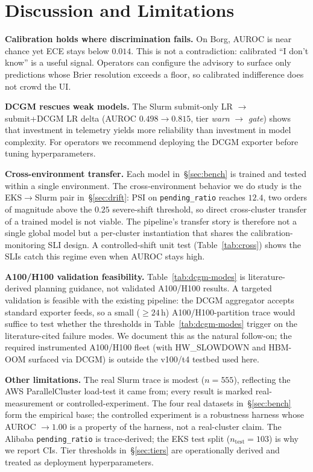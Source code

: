 \documentclass[conference]{IEEEtran}
\begin{document}
\section{Discussion and Limitations}
\textbf{Calibration holds where discrimination fails.} On Borg, AUROC is near chance yet ECE stays below $0.014$. This is not a contradiction: calibrated ``I don't know'' is a useful signal. Operators can configure the advisory to surface only predictions whose Brier resolution exceeds a floor, so calibrated indifference does not crowd the UI.

\textbf{DCGM rescues weak models.} The Slurm submit-only LR $\to$ submit+DCGM LR delta (AUROC $0.498 \to 0.815$, tier \textit{warn} $\to$ \textit{gate}) shows that investment in telemetry yields more reliability than investment in model complexity. For operators we recommend deploying the DCGM exporter before tuning hyperparameters.

\textbf{Cross-environment transfer.} Each model in~\S\ref{sec:bench} is trained and tested within a single environment. The cross-environment behavior we do study is the EKS$\to$Slurm pair in~\S\ref{sec:drift}: PSI on \texttt{pending\_ratio} reaches $12.4$, two orders of magnitude above the $0.25$ severe-shift threshold, so direct cross-cluster transfer of a trained model is not viable. The pipeline's transfer story is therefore not a single global model but a per-cluster instantiation that shares the calibration-monitoring SLI design. A controlled-shift unit test (Table~\ref{tab:cross}) shows the SLIs catch this regime even when AUROC stays high.

\textbf{A100/H100 validation feasibility.} Table~\ref{tab:dcgm-modes} is literature-derived planning guidance, not validated A100/H100 results. A targeted validation is feasible with the existing pipeline: the DCGM aggregator accepts standard exporter feeds, so a small ($\geq 24$\,h) A100/H100-partition trace would suffice to test whether the thresholds in Table~\ref{tab:dcgm-modes} trigger on the literature-cited failure modes. We document this as the natural follow-on; the required instrumented A100/H100 fleet (with HW\_SLOWDOWN and HBM-OOM surfaced via DCGM) is outside the v100/t4 testbed used here.

\textbf{Other limitations.} The real Slurm trace is modest ($n{=}555$), reflecting the AWS ParallelCluster load-test it came from; every result is marked real-measurement or controlled-experiment. The four real datasets in~\S\ref{sec:bench} form the empirical base; the controlled experiment is a robustness harness whose AUROC $\to 1.00$ is a property of the harness, not a real-cluster claim. The Alibaba \texttt{pending\_ratio} is trace-derived; the EKS test split ($n_{\text{test}}{=}103$) is why we report CIs. Tier thresholds in~\S\ref{sec:tiers} are operationally derived and treated as deployment hyperparameters.
\end{document}
